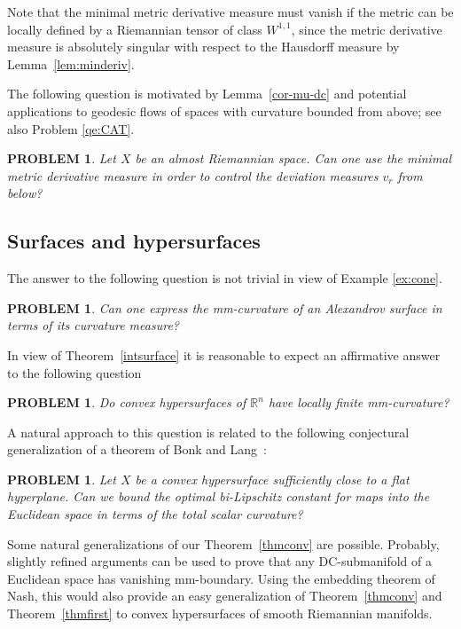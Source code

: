 \documentclass[12pt,leqno,intlimits]{amsart}
\numberwithin{equation}{section}
\newtheorem{quest}[thm]{PROBLEM}
\theoremstyle{definition}
\theoremstyle{remark}
\newcommand{\tref}[1]{Theorem~\ref{#1}}
\newcommand{\lref}[1]{Lemma~\ref{#1}}
\newcommand{\R}{\mathbb{R}}
\begin{document}
Note that the minimal metric derivative measure must vanish if the metric can be locally defined by a Riemannian
tensor of class $W^{1,1}$, since the metric derivative measure is absolutely singular with respect to the Hausdorff measure by \lref{lem:minderiv}.

The following question is motivated by \lref{cor-mu-dc} and potential applications to geodesic flows of spaces with curvature bounded from above; see also Problem \ref{qe:CAT}.

\begin{quest} \label{qe:BV}
Let $X$ be an almost Riemannian space. Can one use the minimal metric derivative measure in order to control the deviation measures $v_r$ from below?
\end{quest}

\subsection{Surfaces and hypersurfaces}
The answer to the following question is not trivial in view of Example \ref{ex:cone}.

\begin{quest}
Can one express the mm-curvature of an Alexandrov surface in terms of its curvature measure?
\end{quest}

In view of \tref{intsurface} it is reasonable to expect an affirmative answer to the following question
\begin{quest}
Do convex hypersurfaces of $\R^n$ have locally finite mm-curvature?
\end{quest}

A natural approach to this question is related to the following conjectural generalization of a theorem of Bonk and Lang~\cite{Bonk-Lang}:
\begin{quest}
Let $X$ be a convex hypersurface sufficiently close to a flat hyperplane. Can we bound the optimal bi-Lipschitz constant for maps into the Euclidean space in terms of the total scalar curvature?
\end{quest}

Some natural generalizations of our \tref{thmconv} are possible. Probably, slightly refined arguments can be used to
prove that any DC-submanifold of a Euclidean space has vanishing mm-boundary. Using the embedding theorem of Nash, this would also provide an easy generalization of \tref{thmconv} and \tref{thmfirst} to convex hypersurfaces of smooth Riemannian manifolds.
\end{document}
